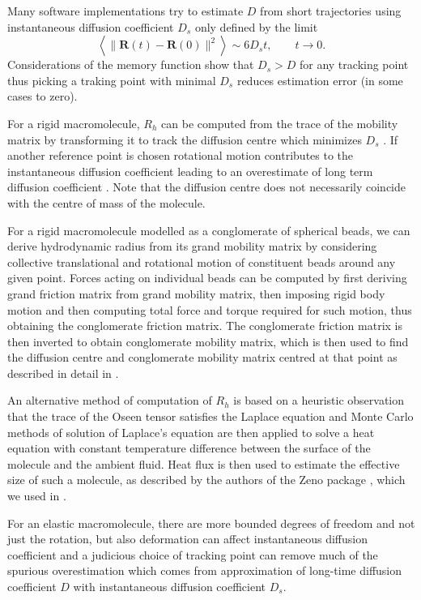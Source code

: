 \documentclass{doctoral}
\begin{document}
Many software implementations try to estimate $D$ from short trajectories using instantaneous diffusion coefficient $D_{s}$ only defined by the limit
\begin{equation}
    \left< \lVert \bm{R}(t) - \bm{R}(0)\rVert^2 \right> \sim 6 D_{s} t, \quad \quad t \to 0.
\end{equation}
Considerations of the memory function show that $D_{s} > D$ for any tracking point\cite{Cichocki_2019} thus picking a traking point with minimal $D_{s}$ reduces estimation error (in some cases to zero).

For a rigid macromolecule, $R_h$ can be computed from the trace of the mobility matrix by transforming it to track the diffusion centre which minimizes $D_{s}$ \cite{Zuk_2018}.
If another reference point is chosen rotational motion contributes to the instantaneous diffusion coefficient leading to an overestimate of long term diffusion coefficient \cite{Cichocki_2015}.
Note that the diffusion centre does not necessarily coincide with the centre of mass of the molecule.

For a rigid macromolecule modelled as a conglomerate of spherical beads, we can derive hydrodynamic radius from its grand mobility matrix by considering collective translational and rotational motion of constituent beads around any given point.
Forces acting on individual beads can be computed by first deriving grand friction matrix from grand mobility matrix, then imposing rigid body motion and then computing total force and torque required for such motion, thus obtaining the conglomerate friction matrix.
The conglomerate friction matrix is then inverted to obtain conglomerate mobility matrix, which is then used to find the diffusion centre and conglomerate mobility matrix centred at that point as described in detail in \textcite{Cichocki_2019}.

An alternative method of computation of $R_h$ is based on a heuristic observation that the trace of the Oseen tensor satisfies the Laplace equation and Monte Carlo methods of solution of Laplace's equation are then applied to solve a heat equation with constant temperature difference between the surface of the molecule and the ambient fluid.
Heat flux is then used to estimate the effective size of such a molecule, as described by the authors of the Zeno package \cite{Juba_2017}, which we used in \textcite{Waszkiewicz_2023_dna}.

For an elastic macromolecule, there are more bounded degrees of freedom and not just the rotation, but also deformation can affect instantaneous diffusion coefficient and a judicious choice of tracking point can remove much of the spurious overestimation which comes from approximation of long-time diffusion coefficient $D$ with instantaneous diffusion coefficient $D_{s}$.
\end{document}
